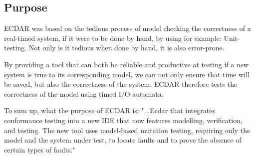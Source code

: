 \subsection{Purpose}
ECDAR was based on the tedious process of model checking the correctness of a real-timed system, if it were to be done by hand, by using for example: Unit-testing.
Not only is it tedious when done by hand, it is also error-prone.

By providing a tool that can both be reliable and productive at testing if a new system is true to its corresponding model, we can not only ensure that time will be saved, but also the correctness of the system.
ECDAR therefore tests the correctness of the model using timed I/O automata.

To sum up, what the purpose of ECDAR is:
"...Ecdar that integrates conformance testing into a new IDE that now features
modelling, verification, and testing. The new tool uses model-based mutation testing, requiring only
the model and the system under test, to locate faults and to prove the absence of certain types of
faults." \cite{Gundersen_2018}